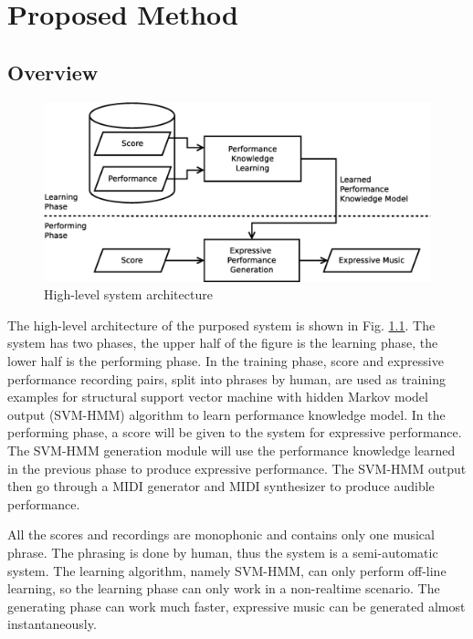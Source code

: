 \chapter{Proposed Method}
\label{chap:proposed}
\section{Overview}
      \begin{figure}[tp]
         \begin{center}
            \includegraphics[width=\textwidth]{fig/high_lev_arch}
         \end{center}
         \caption{High-level system architecture} 
         \label{fig:flow}
      \end{figure}
The high-level architecture of the purposed system is shown in Fig. \ref{fig:flow}. The system has two phases, the upper half of the figure is the learning phase, the lower half is the performing phase.  In the training phase, score and expressive performance recording pairs, split into phrases by human, are used as training examples for structural support vector machine with hidden Markov model output (SVM-HMM) algorithm to learn performance knowledge model. In the performing phase, a score will be given to the system for expressive performance. The SVM-HMM generation module will use the performance knowledge learned in the previous phase to produce expressive performance. The SVM-HMM output then go through a MIDI generator and MIDI synthesizer to produce audible performance.

All the scores and recordings are monophonic and contains only one musical phrase. The phrasing is done by human, thus the system is a semi-automatic system. The learning algorithm, namely SVM-HMM, can only perform off-line learning, so the learning phase can only work in a non-realtime scenario. The generating phase can work much faster, expressive music can be generated almost instantaneously. 


